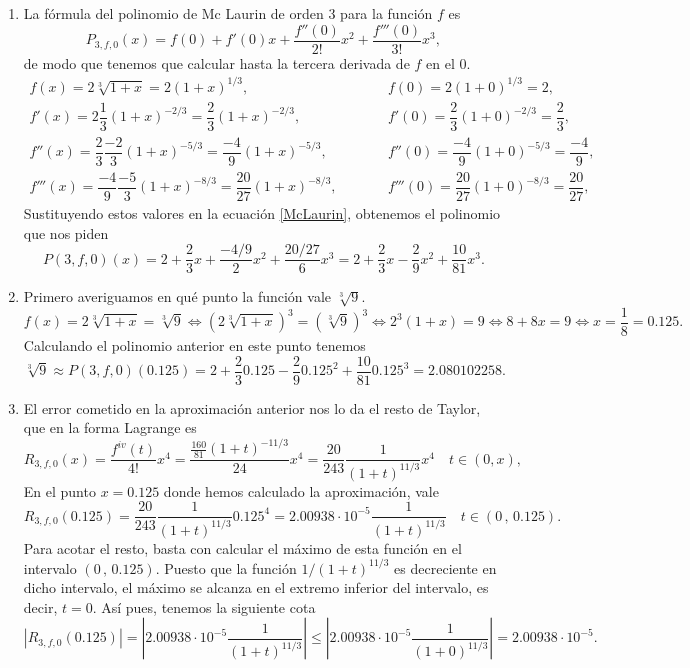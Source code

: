 {\begin{enumerate}
\item   La fórmula del polinomio de Mc Laurin de orden $3$ para la 
    función $f$ es
\begin{equation}
    P_{3,f,0} (x)= f(0)+ 
    f'(0)x+\frac{f''(0)}{2!}x^2+\frac{f'''(0)}{3!}x^3,
    \label{McLaurin}
\end{equation}
de modo que tenemos que calcular hasta la tercera derivada de $f$ en el 0.
\[ \renewcommand{\arraystretch}{2}
    \begin{array}{lll}
        f(x)=2\sqrt[3]{{1 + x}}=2(1+x)^{1/3}, & \quad \quad & f(0)=2(1+0)^{1/3}=2,  \\
        f'(x)=2\dfrac{1}{3}(1+x)^{-2/3}=\dfrac{2}{3}(1+x)^{-2/3}, &  & f'(0)=\dfrac{2}{3}(1+0)^{-2/3}=\dfrac{2}{3},\\
        f''(x)=\dfrac{2}{3}\dfrac{-2}{3}(1+x)^{-5/3}=\dfrac{-4}{9}(1+x)^{-5/3}, &  & f''(0)=\dfrac{-4}{9}(1+0)^{-5/3}=\dfrac{-4}{9},\\
        f'''(x)=\dfrac{-4}{9}\dfrac{-5}{3}(1+x)^{-8/3}=\dfrac{20}{27}(1+x)^{-8/3}, &  & f'''(0)=\dfrac{20}{27}(1+0)^{-8/3}=\dfrac{20}{27},
     \end{array}  
\]
Sustituyendo estos valores en la ecuación \ref{McLaurin}, 
obtenemos el polinomio que nos piden
\[ 
P(3,f,0)(x)= 2+\frac{2}{3}x+\frac{-4/9}{2}x^2+\frac{20/27}{6}x^3=
2+\frac{2}{3}x-\frac{2}{9}x^2+\frac{10}{81}x^3.      
\]    

\item Primero averiguamos en qué punto la función vale $\sqrt[3]{9}$. 
\[
f(x)=2\sqrt[3]{1+x}=\sqrt[3]{9} \Leftrightarrow (2\sqrt[3]{1+x})^3=(\sqrt[3]{9})^3 \Leftrightarrow
2^3(1+x)=9 \Leftrightarrow 8+8x=9 \Leftrightarrow x=\frac{1}{8}=0.125.
\]
Calculando el polinomio anterior en este punto tenemos
\[ 
\sqrt[3]{9}\approx P(3,f,0)(0.125)= 2+\frac{2}{3}0.125-\frac{2}{9}0.125^2+\frac{10}{81}0.125^3=2.080102258.      
\]

\item El error cometido en la aproximación anterior nos lo da el resto de Taylor, que en la forma
Lagrange es
\[
R_{3,f,0}(x)=\frac{f^{iv}(t)}{4!}x^4=\frac{\frac{160}{81} (1+t)^{-11/3}}{24}x^4 = \frac{20}{243}\frac{1}{(1+t)^{11/3}} x^4 \quad t\in(0,x),
\]
En el punto $x=0.125$ donde hemos calculado la aproximación, vale
\[
R_{3,f,0}(0.125)=\frac{20}{243}\frac{1}{(1+t)^{11/3}} 0.125^4= 2.00938\cdot 10^{-5}\frac{1}{(1+t)^{11/3}} \quad t\in(0\,,\,0.125).
\]
Para acotar el resto, basta con calcular el máximo de esta función en el
intervalo $(0\,,\,0.125)$. Puesto que la función $1/(1+t)^{11/3}$ es decreciente en dicho intervalo,
el máximo se alcanza en el extremo inferior del intervalo, es decir,
$t=0$. Así pues, tenemos la siguiente cota
\[
|R_{3,f,0}(0.125)|=|2.00938\cdot 10^{-5}\frac{1}{(1+t)^{11/3}}|\leq
|2.00938\cdot 10^{-5}\frac{1}{(1+0)^{11/3}}|=2.00938\cdot 10^{-5}.
\]
\end{enumerate}
}


